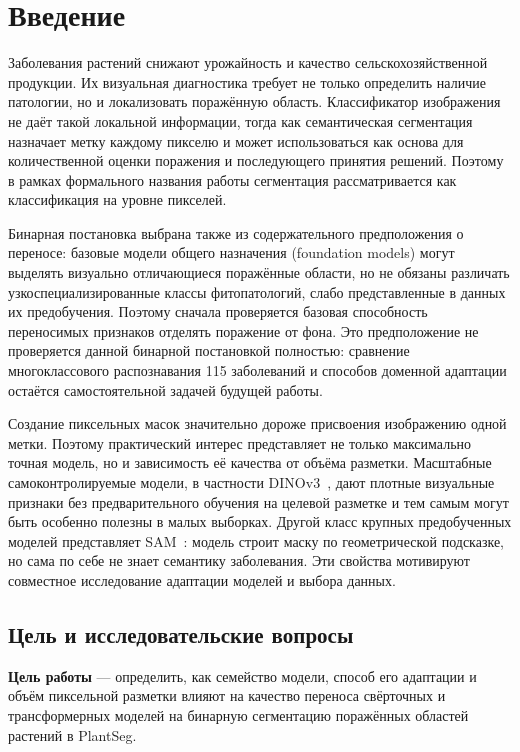 \documentclass[a4paper,12pt]{extarticle}
\begin{document}
\newpage
\section{Введение}

Заболевания растений снижают урожайность и качество сельскохозяйственной
продукции. Их визуальная диагностика требует не только определить наличие
патологии, но и локализовать поражённую область. Классификатор изображения не
даёт такой локальной информации, тогда как семантическая сегментация назначает
метку каждому пикселю и может использоваться как основа для количественной
оценки поражения и последующего принятия решений. Поэтому в рамках формального
названия работы сегментация рассматривается как классификация на уровне пикселей.

Бинарная постановка выбрана также из содержательного предположения о переносе:
базовые модели общего назначения (foundation models) могут выделять визуально отличающиеся
поражённые области, но не обязаны различать узкоспециализированные классы
фитопатологий, слабо представленные в данных их предобучения. Поэтому сначала
проверяется базовая способность переносимых признаков отделять поражение от
фона. Это предположение не проверяется данной бинарной постановкой полностью:
сравнение многоклассового распознавания 115 заболеваний и способов доменной
адаптации остаётся самостоятельной задачей будущей работы.

Создание пиксельных масок значительно дороже присвоения изображению одной
метки. Поэтому практический интерес представляет не только максимально точная
модель, но и зависимость её качества от объёма разметки. Масштабные
самоконтролируемые модели, в частности DINOv3~\cite{dinov3}, дают плотные
визуальные признаки без предварительного обучения на целевой разметке и тем
самым могут быть особенно полезны в малых выборках. Другой класс крупных
предобученных моделей представляет SAM~\cite{sam}: модель строит маску по геометрической
подсказке, но сама по себе не знает семантику заболевания. Эти свойства
мотивируют совместное исследование адаптации моделей и выбора данных.

\subsection{Цель и исследовательские вопросы}

\textbf{Цель работы} --- определить, как семейство модели, способ его адаптации
и объём пиксельной разметки влияют на качество переноса свёрточных и
трансформерных моделей на бинарную сегментацию поражённых областей растений в
PlantSeg.
\end{document}
